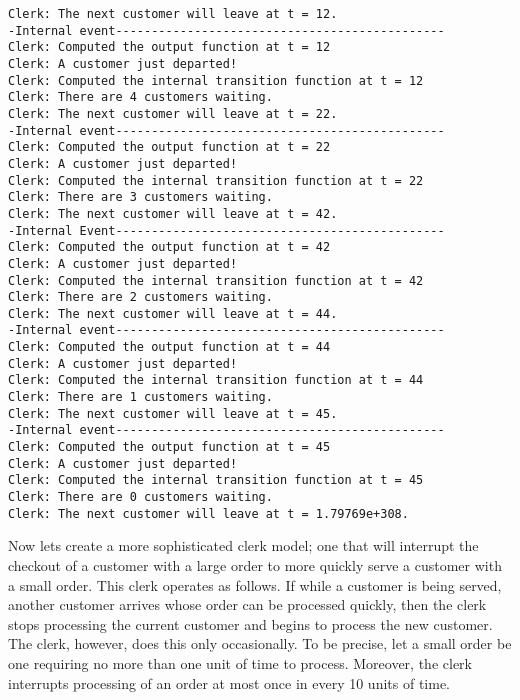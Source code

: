\begin{verbatim}
Clerk: The next customer will leave at t = 12.
-Internal event----------------------------------------------
Clerk: Computed the output function at t = 12
Clerk: A customer just departed!
Clerk: Computed the internal transition function at t = 12
Clerk: There are 4 customers waiting.
Clerk: The next customer will leave at t = 22.
-Internal event----------------------------------------------
Clerk: Computed the output function at t = 22
Clerk: A customer just departed!
Clerk: Computed the internal transition function at t = 22
Clerk: There are 3 customers waiting.
Clerk: The next customer will leave at t = 42.
-Internal Event----------------------------------------------
Clerk: Computed the output function at t = 42
Clerk: A customer just departed!
Clerk: Computed the internal transition function at t = 42
Clerk: There are 2 customers waiting.
Clerk: The next customer will leave at t = 44.
-Internal event----------------------------------------------
Clerk: Computed the output function at t = 44
Clerk: A customer just departed!
Clerk: Computed the internal transition function at t = 44
Clerk: There are 1 customers waiting.
Clerk: The next customer will leave at t = 45.
-Internal event----------------------------------------------
Clerk: Computed the output function at t = 45
Clerk: A customer just departed!
Clerk: Computed the internal transition function at t = 45
Clerk: There are 0 customers waiting.
Clerk: The next customer will leave at t = 1.79769e+308.
\end{verbatim}

Now lets create a more sophisticated clerk model; one that will interrupt the checkout of a customer with a large order to more quickly serve a customer with a small order. This clerk operates as follows. If while a customer is being served, another customer arrives whose order can be processed quickly, then the clerk stops processing the current customer and begins to process the new customer. The clerk, however, does this only occasionally. To be precise, let a small order be one requiring no more than one unit of time to process. Moreover, the clerk interrupts processing of an order at most once in every 10 units of time.

